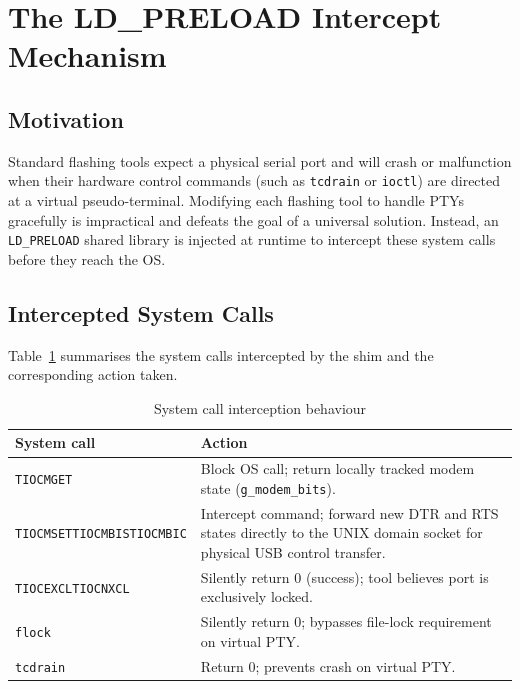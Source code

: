 \documentclass[conference]{IEEEtran}
\begin{document}
\section{The LD\_PRELOAD Intercept Mechanism}
\label{sec:preload}

\subsection{Motivation}

Standard flashing tools expect a physical serial port and will crash or malfunction when their hardware control commands (such as \texttt{tcdrain} or \texttt{ioctl}) are directed at a virtual pseudo-terminal. Modifying each flashing tool to handle PTYs gracefully is impractical and defeats the goal of a universal solution. Instead, an \texttt{LD\_PRELOAD} shared library is injected at runtime to intercept these system calls before they reach the OS.

\subsection{Intercepted System Calls}

Table~\ref{tab:intercepts} summarises the system calls intercepted by the shim and the corresponding action taken.

\begin{table}[H]
\centering
\caption{System call interception behaviour}
\label{tab:intercepts}
\begin{tabular}{@{}p{2.2cm}p{4.8cm}@{}}
\toprule
\textbf{System call} & \textbf{Action} \\
\midrule
\texttt{TIOCMGET} & Block OS call; return locally tracked modem state (\texttt{g\_modem\_bits}). \\
\addlinespace
\texttt{TIOCMSET}\newline\texttt{TIOCMBIS}\newline\texttt{TIOCMBIC} & Intercept command; forward new DTR and RTS states directly to the UNIX domain socket for physical USB control transfer. \\
\addlinespace
\texttt{TIOCEXCL}\newline\texttt{TIOCNXCL} & Silently return 0 (success); tool believes port is exclusively locked. \\
\addlinespace
\texttt{flock} & Silently return 0; bypasses file-lock requirement on virtual PTY. \\
\addlinespace
\texttt{tcdrain} & Return 0; prevents crash on virtual PTY. \\
\bottomrule
\end{tabular}
\end{table}
\end{document}
